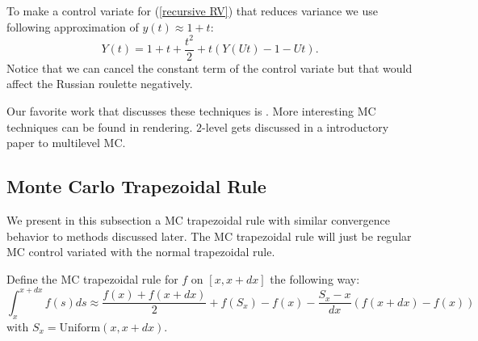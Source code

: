 \documentclass[a4paper,12pt]{article}
\begin{document}
\begin{example}
    To make a control variate for (\ref{recursive RV}) that reduces variance
    we use following approximation of $y(t) \approx 1+t$:
    \begin{equation}
        Y(t)= 1+t+\frac{t^{2}}{2} + t(Y(Ut)-1-Ut).
    \end{equation}
    Notice that we can cancel the constant term of the control variate
    but that would affect the Russian roulette negatively.
\end{example}

\vspace*{0.2cm}
\begin{pythonn}
\end{pythonn}

\begin{related}[MC modification]
    Our favorite work that discusses these techniques is \cite{veach_robust_nodate}.
    More interesting MC techniques  can be found in rendering.
    $2$-level gets discussed in \cite{giles_multilevel_2013} a introductory paper to
    multilevel MC.
\end{related}

\subsection{Monte Carlo Trapezoidal Rule}
We present in this subsection a MC trapezoidal rule with similar convergence behavior to
methods discussed later. The MC trapezoidal rule will just be
regular MC control variated with the normal trapezoidal rule.

\begin{definition}
    Define the MC trapezoidal rule for $f$ on $[x,x+dx]$ the following
    way:
    \begin{equation}
        \int_{x}^{x+dx} f(s)ds \approx
        \frac{f(x)+f(x+dx)}{2} + f(S_{x})-f(x)-\frac{S_{x}-x}{dx} \left(f(x+dx)-f(x)\right)
    \end{equation}
    with $S_{x} = \text{Uniform}(x,x+dx)$.
\end{definition}
\end{document}
